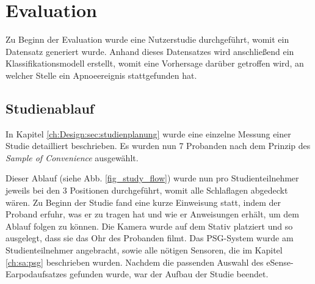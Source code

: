 
\chapter{Evaluation}
\label{ch:Evaluation}

Zu Beginn der Evaluation wurde eine Nutzerstudie durchgeführt, womit ein Datensatz generiert wurde. 
Anhand dieses Datensatzes wird anschließend ein Klassifikationsmodell erstellt, womit eine Vorhersage darüber getroffen wird, an welcher Stelle ein Apnoeereignis stattgefunden hat.

\section{Studienablauf}
In Kapitel \ref{ch:Design:sec:studienplanung} wurde eine einzelne Messung einer Studie detailliert beschrieben.
Es wurden nun 7 Probanden nach dem Prinzip des \textit{Sample of Convenience} ausgewählt.

Dieser Ablauf (siehe Abb. \ref{fig_study_flow}) wurde nun pro Studienteilnehmer jeweils bei den 3 Positionen durchgeführt, womit alle Schlaflagen abgedeckt wären.
Zu Beginn der Studie fand eine kurze Einweisung statt, indem der Proband erfuhr, was er zu tragen hat und wie er Anweisungen erhält, um dem Ablauf folgen zu können. 
Die Kamera wurde auf dem Stativ platziert und so ausgelegt, dass sie das Ohr des Probanden filmt. 
Das PSG-System wurde am Studienteilnehmer angebracht, sowie alle nötigen Sensoren, die im Kapitel \ref{ch:sa:psg} beschrieben wurden.
Nachdem die passenden Auswahl des eSense-Earpodaufsatzes gefunden wurde, war der Aufbau der Studie beendet.

